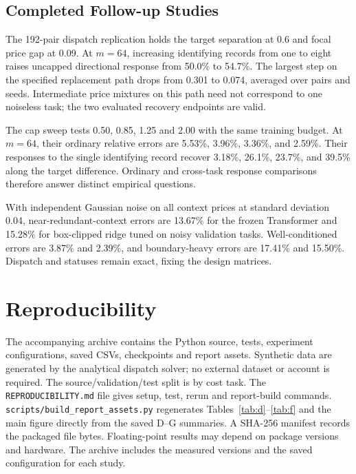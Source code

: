 \documentclass{article}
\begin{document}
\subsection{Completed Follow-up Studies}
The 192-pair dispatch replication holds the target separation at 0.6
and focal price gap at 0.09. At $m=64$, increasing identifying records
from one to eight raises uncapped directional response from 50.0\%
to 54.7\%. The largest step on the specified replacement path drops
from 0.301 to 0.074, averaged over pairs and seeds. Intermediate price
mixtures on this path need not correspond to one noiseless task;
the two evaluated recovery endpoints are valid.

The cap sweep tests 0.50, 0.85, 1.25 and 2.00 with the same training
budget. At $m=64$, their ordinary relative errors are 5.53\%, 3.96\%,
3.36\%, and 2.59\%. Their responses to the single identifying
record recover 3.18\%, 26.1\%, 23.7\%, and 39.5\% along the
target difference. Ordinary and cross-task response comparisons
therefore answer distinct empirical questions.

With independent Gaussian noise on all context prices at
standard deviation 0.04, near-redundant-context errors are 13.67\%
for the frozen Transformer and 15.28\% for box-clipped ridge tuned
on noisy validation tasks. Well-conditioned errors are 3.87\% and
2.39\%, and boundary-heavy errors are 17.41\% and 15.50\%.
Dispatch and statuses remain exact, fixing the design matrices.

\section{Reproducibility}
The accompanying archive contains the Python source, tests, experiment
configurations, saved CSVs, checkpoints and report assets. Synthetic
data are generated by the analytical dispatch solver; no external
dataset or account is required. The source/validation/test split is
by cost task. The \texttt{REPRODUCIBILITY.md} file gives setup,
test, rerun and report-build commands. \texttt{scripts/build\_report\_assets.py}
regenerates Tables~\ref{tab:d}--\ref{tab:f} and the main figure directly
from the saved D--G summaries. A SHA-256 manifest records the packaged
file bytes. Floating-point results may depend on package versions and
hardware. The archive includes the measured versions and the saved
configuration for each study.
\end{document}
